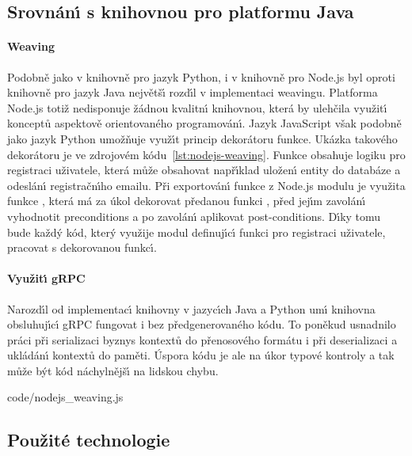 \subsection{Srovnán\'{\i} s knihovnou pro platformu Java}

\paragraph{Weaving} Podobně jako v knihovně pro jazyk Python,
i v knihovně pro Node.js byl oproti knihovně pro jazyk Java
největš\'{\i} rozd\'{\i}l v implementaci weavingu. Platforma Node.js
totiž nedisponuje žádnou kvalitn\'{\i} knihovnou, která by ulehčila
využit\'{\i} konceptů aspektově orientovaného programován\'{\i}.
Jazyk JavaScript však podobně jako jazyk Python umožňuje využ\'{\i}t
princip dekorátoru funkce. Ukázka takového dekorátoru je ve zdrojovém
kódu~\ref{lst:nodejs-weaving}. Funkce  obsahuje logiku pro registraci uživatele,
která může obsahovat např\'{\i}klad uložen\'{\i} entity do databáze a odeslán\'{\i}
registračn\'{\i}ho emailu. Při exportován\'{\i} funkce z Node.js modulu
je využita funkce , která má za úkol dekorovat
předanou funkci , před jej\'{\i}m zavolán\'{\i} vyhodnotit
preconditions a po zavolán\'{\i} aplikovat post-conditions.
D\'{\i}ky tomu bude každ\'y kód, kter\'y využije modul definuj\'{\i}c\'{\i} funkci
pro registraci uživatele, pracovat s dekorovanou funkc\'{\i}.

\paragraph{Využit\'{\i} gRPC} Narozd\'{\i}l od implementac\'{\i} knihovny
v jazyc\'{\i}ch Java a Python um\'{\i} knihovna obsluhuj\'{\i}c\'{\i} gRPC
fungovat i bez předgenerovaného kódu. To poněkud usnadnilo
práci při serializaci byznys kontextů do přenosového formátu
i při deserializaci a ukládán\'{\i} kontextů do paměti. Úspora
kódu je ale na úkor typové kontroly a tak může b\'yt kód náchylnějš\'{\i}
na lidskou chybu.


{code/nodejs_weaving.js}

\subsection{Použité technologie}

